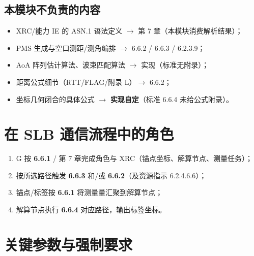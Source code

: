 \documentclass[11pt,a4paper]{ctexart}
\begin{document}
\subsection{本模块不负责的内容}

\begin{itemize}[nosep]
  \item XRC/能力 IE 的 ASN.1 语法定义 $\rightarrow$ 第 7 章（本模块消费解析结果）；
  \item PMS 生成与空口测距/测角编排 $\rightarrow$ 6.6.2 / 6.6.3 / 6.2.3.9；
  \item AoA 阵列估计算法、波束匹配算法 $\rightarrow$ 实现（标准无附录）；
  \item 距离公式细节（RTT/FLAG/附录 L）$\rightarrow$ 6.6.2；
  \item 坐标几何闭合的具体公式 $\rightarrow$ \textbf{实现自定}（标准 6.6.4 未给公式附录）。
\end{itemize}

\section{在 SLB 通信流程中的角色}

\begin{enumerate}[nosep]
  \item G 按 \textbf{6.6.1} / 第 7 章完成角色与 XRC（锚点坐标、解算节点、测量任务）；
  \item 按所选路径触发 \textbf{6.6.3} 和/或 \textbf{6.6.2}（及资源指示 6.2.4.6.6）；
  \item 锚点/标签按 \textbf{6.6.1} 将测量量汇聚到解算节点；
  \item 解算节点执行 \textbf{6.6.4} 对应路径，输出标签坐标。
\end{enumerate}

\section{关键参数与强制要求}
\end{document}
